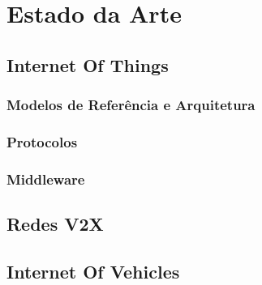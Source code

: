
%

\chapter{Estado da Arte}

\glsresetall


\section{Internet Of Things}
\label{sec:Internet_Of_Things}


\subsection{Modelos de Referência e Arquitetura}
\label{sub:Modelos_de_Referência_e_Arquitetura}


\subsection{Protocolos}
\label{sub:Protocolos}


\subsection{Middleware}
\label{sub:Middleware}



\section{Redes V2X}
\label{sec:Redes_V2X}

\section{Internet Of Vehicles}
\label{sec:Internet_Of_Vehicles}
